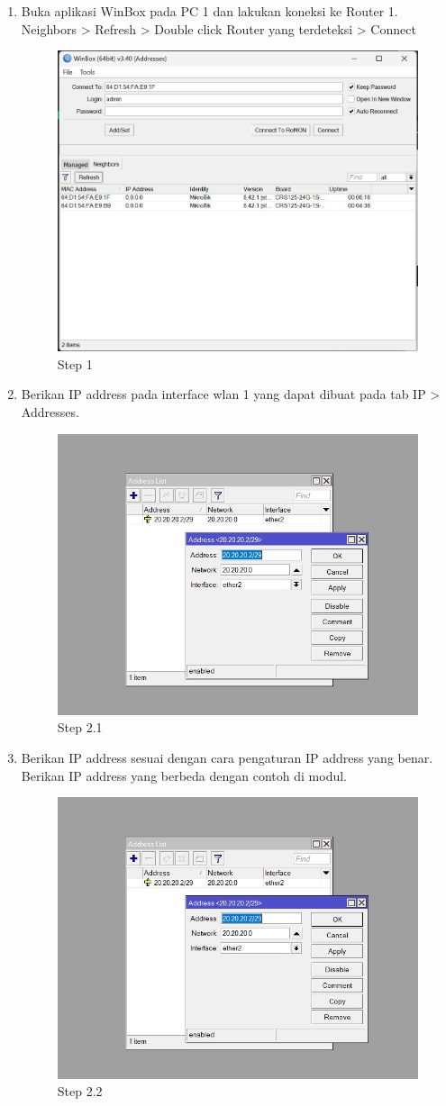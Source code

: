 \begin{enumerate}
	\item Buka aplikasi WinBox pada PC 1 dan lakukan koneksi ke Router 1.
	\\Neighbors > Refresh > Double click Router yang terdeteksi > Connect
	\begin{figure}[H]
		\centering
		\includegraphics[width=0.5\linewidth]{P1/img/per1pc1step1.jpg}
		\caption{Step 1}
		\label{fig:gambar1}
	\end{figure}

	\item Berikan IP address pada interface wlan 1 yang dapat dibuat pada tab IP > Addresses.
	\begin{figure}[H]
		\centering
		\includegraphics[width=0.5\linewidth]{P1/img/per1pc1step2.jpg}
		\caption{Step 2.1}
		\label{fig:gambar2}
	\end{figure}

	\item Berikan IP address sesuai dengan cara pengaturan IP address yang benar. Berikan IP address
	yang berbeda dengan contoh di modul.
	\begin{figure}[H]
		\centering
		\includegraphics[width=0.5\linewidth]{P1/img/per1pc1step2.jpg}
		\caption{Step 2.2}
		\label{fig:gambar3}
	\end{figure}


\end{enumerate}
